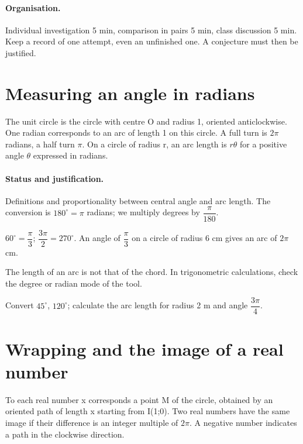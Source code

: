\paragraph{Organisation.} Individual investigation 5 min, comparison in pairs 5 min, class discussion 5 min. Keep a record of one attempt, even an unfinished one. A conjecture must then be justified.
\mxnewpage
\section{Measuring an angle in radians}\label{C10-U1}
\begin{keypoint}
The unit circle is the circle with centre O and radius 1, oriented anticlockwise. One radian corresponds to an arc of length 1 on this circle. A full turn is $2\pi$ radians, a half turn $\pi$. On a circle of radius r, an arc length is $r\theta$ for a positive angle $\theta$ expressed in radians.
\end{keypoint}
\paragraph{Status and justification.} Definitions and proportionality between central angle and arc length. The conversion is $180^\circ=\pi$ radians; we multiply degrees by $\dfrac{\pi}{180}$.
\begin{example}$60^\circ =\dfrac{\pi}{3}$; $\dfrac{3\pi}{2}=270^\circ $. An angle of $\dfrac{\pi}{3}$ on a circle of radius 6 cm gives an arc of $2\pi$ cm.\end{example}\label{C10-EX1}
\begin{pitfall}The length of an arc is not that of the chord. In trigonometric calculations, check the degree or radian mode of the tool.\end{pitfall}
\begin{application}Convert $45^\circ$, $120^\circ$; calculate the arc length for radius 2 m and angle $\dfrac{3\pi}{4}$.\end{application}\label{C10-AP1}
\section{Wrapping and the image of a real number}\label{C10-U2}
\begin{keypoint}
To each real number x corresponds a point M of the circle, obtained by an oriented path of length x starting from I(1;0). Two real numbers have the same image if their difference is an integer multiple of $2\pi$. A negative number indicates a path in the clockwise direction.
\end{keypoint}
